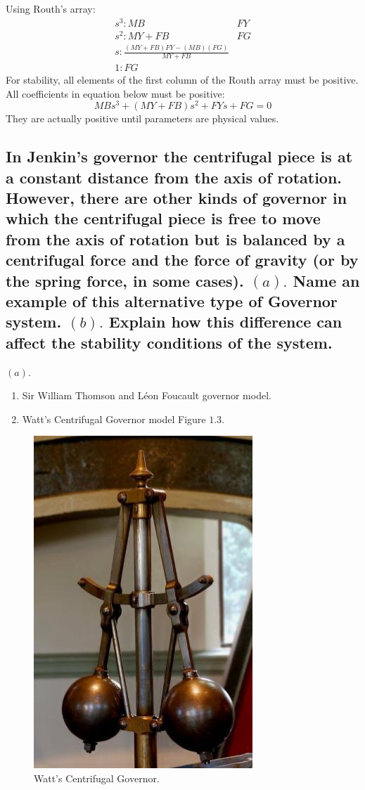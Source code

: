 \documentclass[11pt]{scrartcl} %
\begin{document}
Using Routh's array:
\[
\begin{array}{lc}
s^{3}: M B & F Y \\
s^{2}: M Y+F B & F G \\
s: \frac{(M Y+F B) F Y-(M B)(F G)}{M Y+F B} & \\
1: F G &
\end{array}
\]
For stability, all elements of the first column of the Routh array must be positive.
All coefficients in equation below must be positive:
\begin{equation}
M B s^{3}+(M Y+F B) s^{2}+F Y s+F G=0
\end{equation}
They are actually positive until parameters are physical values.

\subsection{In Jenkin's governor the centrifugal piece is at a constant distance from the axis of rotation. However, there are other kinds of governor in which the centrifugal piece is free to move from the axis of rotation but is balanced by a centrifugal force and the force of gravity (or by the spring force, in some cases).\newline
$(a) .$ Name an example of this alternative type of Governor system.\newline
$(b) .$ Explain how this difference can affect the stability conditions of the system.}
$(a) .$ 
\begin{enumerate}
	\item Sir William Thomson and Léon Foucault governor model.
	\item Watt's Centrifugal Governor model Figure $1.3 $. 
\end{enumerate}
\begin{figure}[h] 
	\centering
	\includegraphics[width=0.3\columnwidth]{images/p3.JPG} 
	\caption{Watt's Centrifugal Governor.}
\end{figure}
\end{document}
